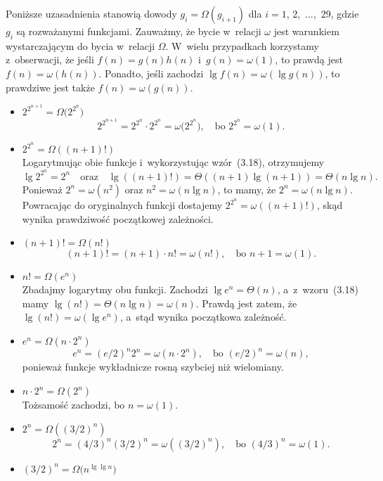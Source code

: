 \subsubsection{} %
Poniższe uzasadnienia stanowią dowody $g_i=\Omega(g_{i+1})$ dla $i=1$, 2,~$\dots$,~29, gdzie $g_i$ są rozważanymi funkcjami. Zauważmy, że bycie w~relacji $\omega$ jest warunkiem wystarczającym do bycia w~relacji $\Omega$. W~wielu przypadkach korzystamy z~obserwacji, że jeśli $f(n)=g(n)h(n)$ i~$g(n)=\omega(1)$, to prawdą jest $f(n)=\omega(h(n))$. Ponadto, jeśli zachodzi $\lg f(n)=\omega(\lg g(n))$, to prawdziwe jest także $f(n)=\omega(g(n))$.
\begin{itemize}
\item $2^{2^{n+1}}=\Omega\bigl(2^{2^n}\bigr)$ \\
	\[
		2^{2^{n+1}} = 2^{2^n}\cdot2^{2^n} = \omega\bigl(2^{2^n}\bigr), \quad\text{bo $2^{2^n} = \omega(1)$}.
	\]
\item $2^{2^n}=\Omega((n+1)!)$ \\
	Logarytmując obie funkcje i~wykorzystując wzór~(3.18), otrzymujemy
	\[
		\lg 2^{2^n} = 2^n \quad\text{oraz}\quad \lg((n+1)!) = \Theta((n+1)\lg(n+1)) = \Theta(n\lg n).
	\]
	Ponieważ $2^n=\omega(n^2)$ oraz $n^2=\omega(n\lg n)$, to mamy, że $2^n=\omega(n\lg n)$. Powracając do oryginalnych funkcji dostajemy $2^{2^n}=\omega((n+1)!)$, skąd wynika prawdziwość początkowej zależności.
\item $(n+1)!=\Omega(n!)$
	\[
		(n+1)! = (n+1)\cdot n! = \omega(n!), \quad\text{bo $n+1 = \omega(1)$}.
	\]
\item $n!=\Omega(e^n)$ \\
	Zbadajmy logarytmy obu funkcji. Zachodzi $\lg e^n=\Theta(n)$, a~z~wzoru~(3.18) mamy $\lg(n!)=\Theta(n\lg n)=\omega(n)$. Prawdą jest zatem, że $\lg(n!)=\omega(\lg e^n)$, a~stąd wynika początkowa zależność.
\item $e^n=\Omega(n\cdot2^n)$ \\
	\[
		e^n = (e/2)^n2^n = \omega(n\cdot2^n), \quad\text{bo $(e/2)^n = \omega(n)$},
	\]
	ponieważ funkcje wykładnicze rosną szybciej niż wielomiany.
\item $n\cdot2^n=\Omega(2^n)$ \\
	Tożsamość zachodzi, bo $n = \omega(1)$.
\item $2^n=\Omega((3/2)^n)$ \\
	\[
		2^n = (4/3)^n(3/2)^n = \omega((3/2)^n), \quad\text{bo $(4/3)^n = \omega(1)$}.
	\]
\item $(3/2)^n=\Omega\bigl(n^{\lg\lg n}\bigr)$ \\

\end{itemize}

